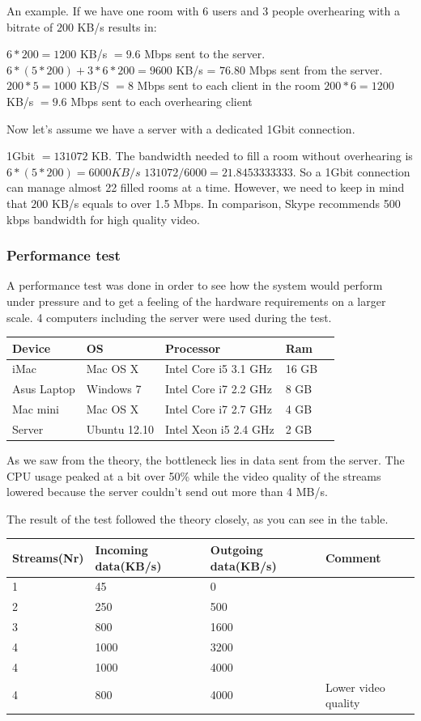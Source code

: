 \documentclass[12pt, titlepage]{article}
\begin{document}
An example. If we have one room with 6 users and 3 people overhearing with a bitrate of $200$ KB/s results in:

$6*200 = 1 200$ KB/s $= 9.6$ Mbps sent to the server.
$6*(5*200) + 3*6*200 = 9 600$ KB/s = $76.80$ Mbps sent from the server.
$200*5 = 1000$ KB/S  $= 8$ Mbps sent to each client in the room
$200*6 = 1200$ KB/s $= 9.6$ Mbps sent to each overhearing client

Now let's assume we have a server with a dedicated 1Gbit connection.

1Gbit $= 131 072$ KB.
The bandwidth needed to fill a room without overhearing is $6*(5*200) = 6 000 KB/s$
$131 072/6 000 = 21.8453333333$. So a 1Gbit connection can manage almost 22 filled rooms at a time. However, we need to keep in mind that $200$ KB/s equals to over 1.5 Mbps. In comparison, Skype recommends 500 kbps bandwidth for high quality video\cite{39}.
\subsubsection{Performance test}

A performance test was done in order to see how the system would perform under pressure and to get a feeling of the hardware requirements on a larger scale. 4 computers including the server were used during the test.
\begin{center}
    \begin{tabular}{| l | l | l | l | l |}
    \hline
    Device & OS & Processor & Ram \\ \hline
    iMac & Mac OS X & Intel Core i5 3.1 GHz & 16 GB\\ \hline
    Asus Laptop & Windows 7 & Intel Core i7 2.2 GHz & 8 GB \\ \hline
    Mac mini & Mac OS X & Intel Core i7 2.7 GHz & 4 GB \\ \hline
    Server & Ubuntu 12.10 & Intel Xeon i5 2.4 GHz & 2 GB\\ \hline
    \end{tabular}
\end{center}
As we saw from the theory, the bottleneck lies in data sent from the server. The CPU usage peaked at a bit over 50\% while the video quality of the streams lowered because the server couldn't send out more than 4 MB/s.

The result of the test followed the theory closely, as you can see in the table.

\begin{center}
    \begin{tabularx}{\textwidth}{|X|X|X|l|}
    \hline
    Streams(Nr) & Incoming data(KB/s) & Outgoing data(KB/s) & Comment \\ \hline
    1 & 45 & 0 & \\ \hline
    2 & 250 & 500 & \\ \hline
    3 & 800 & 1600 & \\ \hline
    4 & 1000 & 3200 &\\ \hline
    4 & 1000 & 4000 &\\ \hline
    4 & 800 & 4000 & Lower video quality\\ \hline
    \end{tabularx}
\end{center}
\end{document}
